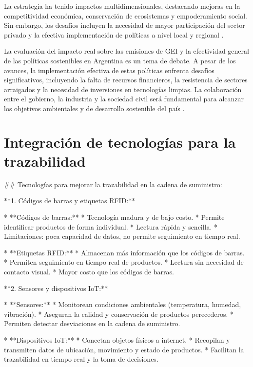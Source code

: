 \documentclass[main.tex]{subfiles}
\begin{document}
La estrategia ha tenido impactos multidimensionales, destacando mejoras en la competitividad económica, conservación de ecosistemas y empoderamiento social. Sin embargo, los desafíos incluyen la necesidad de mayor participación del sector privado y la efectiva implementación de políticas a nivel local y regional \cite{sostenible2021argentina}.

La evaluación del impacto real sobre las emisiones de GEI y la efectividad general de las políticas sostenibles en Argentina es un tema de debate. A pesar de los avances, la implementación efectiva de estas políticas enfrenta desafíos significativos, incluyendo la falta de recursos financieros, la resistencia de sectores arraigados y la necesidad de inversiones en tecnologías limpias. La colaboración entre el gobierno, la industria y la sociedad civil será fundamental para alcanzar los objetivos ambientales y de desarrollo sostenible del país \cite{dormido2021fundar, sostenible2021argentina}.

\section{Integración de tecnologías para la trazabilidad}

## Tecnologías para mejorar la trazabilidad en la cadena de suministro:

**1. Códigos de barras y etiquetas RFID:**

* **Códigos de barras:**
    * Tecnología madura y de bajo costo.
    * Permite identificar productos de forma individual.
    * Lectura rápida y sencilla.
    * Limitaciones: poca capacidad de datos, no permite seguimiento en tiempo real.

* **Etiquetas RFID:**
    * Almacenan más información que los códigos de barras.
    * Permiten seguimiento en tiempo real de productos.
    * Lectura sin necesidad de contacto visual.
    * Mayor costo que los códigos de barras.

**2. Sensores y dispositivos IoT:**

* **Sensores:**
    * Monitorean condiciones ambientales (temperatura, humedad, vibración).
    * Aseguran la calidad y conservación de productos perecederos.
    * Permiten detectar desviaciones en la cadena de suministro.

* **Dispositivos IoT:**
    * Conectan objetos físicos a internet.
    * Recopilan y transmiten datos de ubicación, movimiento y estado de productos.
    * Facilitan la trazabilidad en tiempo real y la toma de decisiones.
\end{document}
